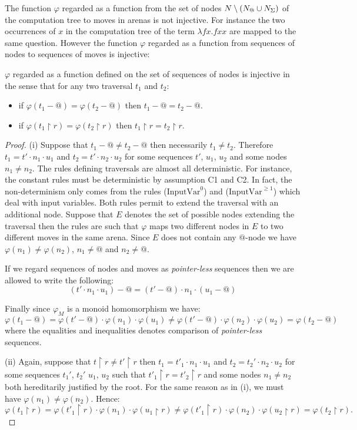 The function $\varphi$ regarded as a function from the set of nodes $N\setminus (N_@ \cup N_\Sigma)$ of the computation tree to moves in arenas is not injective.
For instance the two occurrences of $x$ in the computation tree of the term $\lambda f x. f x x$ are mapped to the same question. However
the function $\varphi$ regarded as a function from sequences of nodes to sequences of moves is injective:
\begin{lem}
$\varphi$ regarded as a function defined on the set of
sequences of nodes is injective in the sense that for any two traversal $t_1$ and $t_2$:
\begin{itemize}
\item[(i)] if $\varphi (t_1 - @ ) = \varphi (t_2 - @ )$ then $t_1-@ =t_2 -@$.
\item[(ii)] if $\varphi (t_1 \upharpoonright r ) = \varphi (t_2 \upharpoonright r )$ then $t_1\upharpoonright r = t_2\upharpoonright r$.
\end{itemize}
\end{lem}
\begin{proof}
(i) Suppose that $t_1-@\neq t_2-@$ then necessarily $t_1 \neq t_2$. Therefore
 $t_1 = t' \cdot n_1 \cdot u_1$ and $t_2 = t' \cdot n_2 \cdot u_2$ for some sequences $t'$, $u_1$, $u_2$
and some nodes $n_1\neq n_2$.
The rules defining traversals are almost all deterministic. For instance, the constant rules must be deterministic by assumption C1 and C2.
In fact, the non-determinism only comes from the rules
($\mbox{InputVar}^0$) and ($\mbox{InputVar}^{\geq 1}$) which deal with input variables. Both rules permit to extend the traversal
with an additional node. Suppose that $E$ denotes the set of possible nodes extending the traversal then the rules are such that
$\varphi$ maps two different nodes in $E$ to two different moves in the same arena. Since $E$ does not contain any $@$-node we have
$\varphi(n_1) \neq \varphi(n_2)$, $n_1 \neq @$ and $n_2 \neq @$.

If we regard sequences of nodes and moves as \emph{pointer-less} sequences then we are allowed to write the following:
$$ (t' \cdot n_1 \cdot u_1) - @ = (t' - @) \cdot n_1 \cdot (u_1 -@)$$

Finally since $\varphi_M$ is a monoid homomorphism we have:
$$ \varphi(t_1-@) = \varphi(t'-@) \cdot \varphi(n_1) \cdot \varphi(u_1) \neq \varphi(t'-@) \cdot \varphi(n_2) \cdot \varphi(u_2) = \varphi(t_2-@) $$
where the equalities and inequalities denotes comparison of \emph{pointer-less} sequences.

(ii) Again, suppose that $t \upharpoonright r \neq t' \upharpoonright r$ then
 $t_1 = t'_1 \cdot n_1 \cdot u_1$ and $t_2 = t_2' \cdot n_2 \cdot u_2$ for some sequences $t_1'$, $t_2'$ $u_1$, $u_2$
 such that $t'_1 \upharpoonright r = t'_2 \upharpoonright r $
and some nodes $n_1 \neq n_2$ both hereditarily justified by the root.
For the same reason as in (i), we must have $\varphi(n_1) \neq \varphi(n_2)$. Hence:
$$ \varphi(t_1\upharpoonright r) =
        \varphi(t'_1\upharpoonright r) \cdot \varphi(n_1) \cdot \varphi(u_1 \upharpoonright r)
    \neq \varphi(t'_1\upharpoonright r) \cdot \varphi(n_2) \cdot \varphi(u_2 \upharpoonright r)
         = \varphi(t_2\upharpoonright r).$$
\end{proof}

